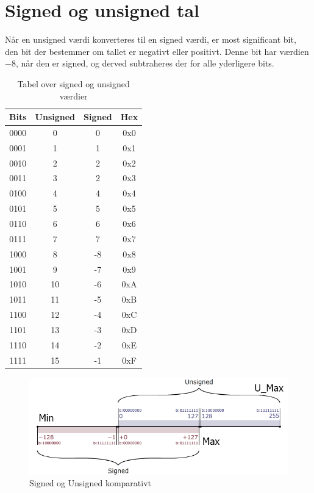 \section{Signed og unsigned tal}
Når en unsigned værdi konverteres til en signed værdi, er most significant bit, den bit der bestemmer om tallet er negativt eller positivt.
Denne bit har værdien $-8$, når den er signed, og derved subtraheres der for alle yderligere bits.
\begin{table}[h]
    \centering
    \begin{tabular}{c|c|c|c}
        Bits&Unsigned&Signed&Hex\\\hline
        0000&0&0&0x0\\
        0001&1&1&0x1\\
        0010&2&2&0x2\\
        0011&3&2&0x3\\
        0100&4&4&0x4\\
        0101&5&5&0x5\\
        0110&6&6&0x6\\
        0111&7&7&0x7\\
        1000&8&-8&0x8\\
        1001&9&-7&0x9\\
        1010&10&-6&0xA\\
        1011&11&-5&0xB\\
        1100&12&-4&0xC\\
        1101&13&-3&0xD\\
        1110&14&-2&0xE\\
        1111&15&-1&0xF\\
    \end{tabular}
    \caption{Tabel over signed og unsigned værdier}
    \label{tab:bits}
\end{table}
\begin{figure}[h!]
    \centering
    \includegraphics[width=\textwidth]{figures/signed.png}
    \caption{Signed og Unsigned komparativt}
    \label{fig:signed}
\end{figure}
